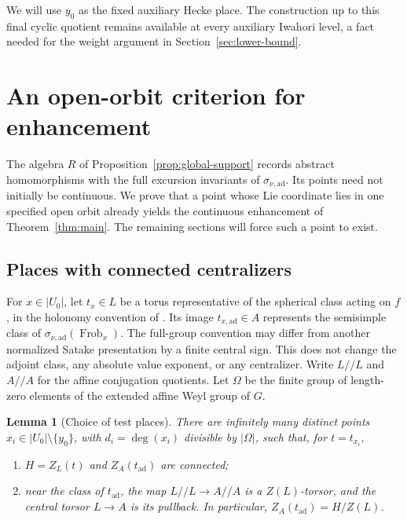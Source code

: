 \documentclass[11pt]{article}
\numberwithin{equation}{section}
\newtheorem{lemma}[theorem]{Lemma}
\theoremstyle{definition}
\theoremstyle{remark}
\newcommand{\Frob}{\operatorname{Frob}}
\begin{document}
We will use $y_0$ as the fixed auxiliary Hecke place.  The construction
up to this final cyclic quotient remains available at every auxiliary
Iwahori level, a fact needed for the weight argument in
Section~\ref{sec:lower-bound}.


\section{An open-orbit criterion for enhancement}
\label{sec:open-orbit}

The algebra $R$ of Proposition~\ref{prop:global-support} records
abstract homomorphisms with the full excursion invariants of
$\sigma_{\nu,\mathrm{ad}}$.  Its points need not initially be
continuous.  We prove that a point whose Lie coordinate lies in one
specified open orbit already yields the continuous enhancement of
Theorem~\ref{thm:main}.  The remaining sections will force such a
point to exist.

\subsection{Places with connected centralizers}

For $x\in |U_0|$, let $t_x\in L$ be a torus representative of the
spherical class acting on $f$, in the holonomy convention of
\cite[Section~2]{Parent}.  Its image $t_{x,\mathrm{ad}}\in A$
represents the semisimple class of
$\sigma_{\nu,\mathrm{ad}}(\Frob_x)$.  The full-group convention
may differ from another normalized Satake presentation by a finite
central sign.  This does not change the adjoint class, any absolute
value exponent, or any centralizer.  Write $L/\!/L$ and $A/\!/A$
for the affine conjugation quotients.  Let $\Omega$ be the finite
group of length-zero elements of the extended affine Weyl group of
$G$.

\begin{lemma}[Choice of test places]\label{lem:test-places}
There are infinitely many distinct points
$x_i\in |U_0|\setminus\{y_0\}$, with $d_i=\deg(x_i)$ divisible
by $|\Omega|$, such that, for $t=t_{x_i}$,
\begin{enumerate}[label=\textup{(\roman*)}]
\item $H=Z_L(t)$ and $Z_A(t_{\mathrm{ad}})$ are connected;
\item near the class of $t_{\mathrm{ad}}$, the map
$L/\!/L\to A/\!/A$ is a $Z(L)$-torsor, and the central torsor
$L\to A$ is its pullback.  In particular,
$Z_A(t_{\mathrm{ad}})=H/Z(L)$.
\end{enumerate}
\end{lemma}
\end{document}
